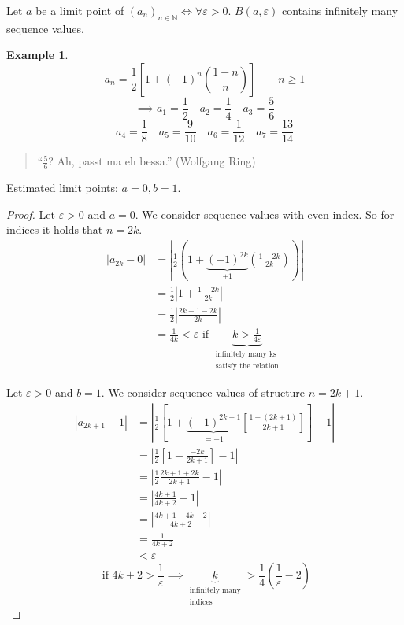 \documentclass[a4paper,landscape,twocolumn]{article}
\theoremstyle{definition}
\newtheorem{ex}{Example}
\newcommand\abs[1]{\left|#1\right|}
\newcommand\seq[1]{{\left(#1\right)}_{n \in \mathbb N}}
\begin{document}
Let $a$ be a limit point of $\seq{a_n} \iff \forall \varepsilon > 0$.
$B(a, \varepsilon)$ contains infinitely many sequence values.

\begin{ex}
  \[ a_n = \frac12 \left[1 + (-1)^n \left(\frac{1-n}{n}\right)\right] \qquad n \geq 1 \]
  \[ \implies a_1 = \frac12 \quad a_2 = \frac14 \quad a_3 = \frac56 \]
  \[ a_4 = \frac18 \quad a_5 = \frac{9}{10} \quad a_6 = \frac{1}{12} \quad a_7 = \frac{13}{14} \]
  \begin{quote}
    \foreignlanguage{ngerman}{\enquote{$\frac56$? Ah, passt ma eh bessa.} (Wolfgang Ring)}
  \end{quote}

  Estimated limit points: $a = 0, b = 1$.

  \begin{proof}
    Let $\varepsilon > 0$ and $a = 0$. We consider sequence values with even index.
    So for indices it holds that $n = 2k$.
    \begin{align*}
      \abs{a_{2k} - 0}
        &= \abs{\frac12(1 + \underbrace{(-1)^{2k}}_{+1} \left(\frac{1-2k}{2k}\right))} \\
        &= \frac12 \abs{1 + \frac{1-2k}{2k}} \\
        &= \frac12 \abs{\frac{2k + 1 - 2k}{2k}} \\
        &= \frac1{4k} < \varepsilon \text{ if } \underbrace{k > \frac{1}{4\varepsilon}}_{\substack{\text{infinitely many ks} \\ \text{satisfy the relation}}}
    \end{align*}

    Let $\varepsilon > 0$ and $b = 1$. We consider sequence values of structure $n = 2k+1$.
    \begin{align*}
      \abs{a_{2k+1} - 1}
        &= \abs{\frac12 \left[1 + \underbrace{(-1)^{2k+1}}_{=-1} \left[\frac{1 - (2k+1)}{2k+1}\right]\right] - 1} \\
        &= \abs{\frac12 \left[1 - \frac{-2k}{2k+1}\right] - 1} \\
        &= \abs{\frac12 \frac{2k+1+2k}{2k+1} - 1} \\
        &= \abs{\frac{4k+1}{4k+2} - 1} \\
        &= \abs{\frac{4k+1 - 4k-2}{4k+2}} \\
        &= \frac{1}{4k+2} \\
        &< \varepsilon
    \end{align*}
    \[ \text{ if } 4k+2 > \frac1\varepsilon \implies \underbrace{k}_{\substack{\text{infinitely many} \\ \text{indices}}} > \frac14 \left(\frac1\varepsilon - 2\right) \]
  \end{proof}
\end{ex}
\end{document}
